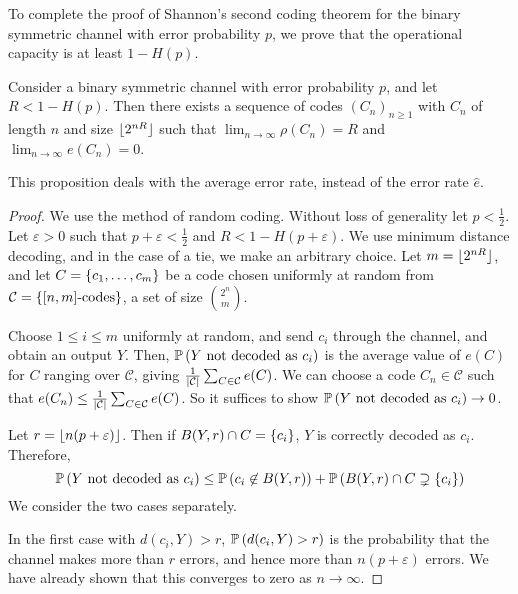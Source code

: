 To complete the proof of Shannon's second coding theorem for the binary symmetric channel with error probability \( p \), we prove that the operational capacity is at least \( 1 - H(p) \).
\begin{proposition}
    Consider a binary symmetric channel with error probability \( p \), and let \( R < 1 - H(p) \).
    Then there exists a sequence of codes \( (C_n)_{n \geq 1} \) with \( C_n \) of length \( n \) and size \( \lfloor2^{nR}\rfloor \) such that \( \lim_{n \to \infty} \rho(C_n) = R \) and \( \lim_{n \to \infty} e(C_n) = 0 \).
\end{proposition}
\begin{remark}
    This proposition deals with the average error rate, instead of the error rate \( \hat e \).
\end{remark}
\begin{proof}
    We use the method of random coding.
    Without loss of generality let \( p < \frac{1}{2} \).
    Let \( \varepsilon > 0 \) such that \( p + \varepsilon < \frac{1}{2} \) and \( R < 1 - H(p + \varepsilon) \).
    We use minimum distance decoding, and in the case of a tie, we make an arbitrary choice.
    Let \( m = \lfloor2^{nR}\rfloor \), and let \( C = \qty{c_1, \dots, c_m} \) be a code chosen uniformly at random from \( \mathcal C = \qty{[n,m]\text{-codes}} \), a set of size \( \binom{2^n}{m} \).
    
    Choose \( 1 \leq i \leq m \) uniformly at random, and send \( c_i \) through the channel, and obtain an output \( Y \).
    Then, \( \mathbb{P}\left({Y \text{ not decoded as } c_i}\right) \) is the average value of \( e(C) \) for \( C \) ranging over \( \mathcal C \), giving \( \frac{1}{\abs{\mathcal C}} \sum_{C \in \mathcal C} e(C) \).
    We can choose a code \( C_n \in \mathcal C \) such that \( e(C_n) \leq \frac{1}{\abs{\mathcal C}}\sum_{C \in \mathcal C} e(C) \).
    So it suffices to show \( \mathbb{P}\left({Y \text{ not decoded as } c_i}\right) \to 0 \).
    
    Let \( r = \lfloor n(p + \varepsilon)\rfloor \).
    Then if \( B(Y,r) \cap C = \qty{c_i} \), \( Y \) is correctly decoded as \( c_i \).
    Therefore,
    \[ \mathbb{P}\left({Y \text{ not decoded as } c_i}\right) \leq \mathbb{P}\left({c_i \not\in B(Y,r)}\right) + \mathbb{P}\left({B(Y,r) \cap C \supsetneq \qty{c_i}}\right) \]
    We consider the two cases separately.

    In the first case with \( d(c_i,Y) > r \), \( \mathbb{P}\left({d(c_i,Y) > r}\right) \) is the probability that the channel makes more than \( r \) errors, and hence more than \( n(p + \varepsilon) \) errors.
    We have already shown that this converges to zero as \( n \to \infty \).


\end{proof}
